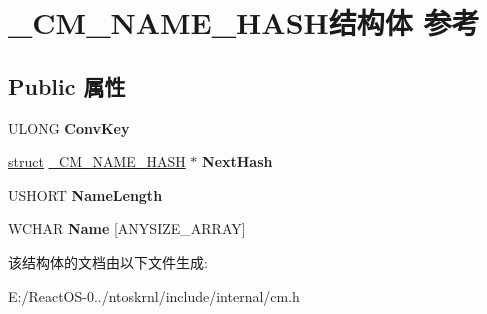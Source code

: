 \hypertarget{struct___c_m___n_a_m_e___h_a_s_h}{}\section{\+\_\+\+C\+M\+\_\+\+N\+A\+M\+E\+\_\+\+H\+A\+S\+H结构体 参考}
\label{struct___c_m___n_a_m_e___h_a_s_h}
\subsection*{Public 属性}
\begin{DoxyCompactItemize}
\item 
\mbox{\label{struct___c_m___n_a_m_e___h_a_s_h_aee31f246bcf9559f31e558f966cf130f}} 
U\+L\+O\+NG {\bfseries Conv\+Key}
\item 
\mbox{\label{struct___c_m___n_a_m_e___h_a_s_h_ac2425441edca9ee9b3660fb3b8094792}} 
\hyperlink{interfacestruct}{struct} \hyperlink{struct___c_m___n_a_m_e___h_a_s_h}{\+\_\+\+C\+M\+\_\+\+N\+A\+M\+E\+\_\+\+H\+A\+SH} $\ast$ {\bfseries Next\+Hash}
\item 
\mbox{\label{struct___c_m___n_a_m_e___h_a_s_h_ae4e449cf1c53827e45edb03ff2cbc80b}} 
U\+S\+H\+O\+RT {\bfseries Name\+Length}
\item 
\mbox{\label{struct___c_m___n_a_m_e___h_a_s_h_a0675a2e74f5f0b7fcc329b3fb70b026e}} 
W\+C\+H\+AR {\bfseries Name} \mbox{[}A\+N\+Y\+S\+I\+Z\+E\+\_\+\+A\+R\+R\+AY\mbox{]}
\end{DoxyCompactItemize}


该结构体的文档由以下文件生成\+:\begin{DoxyCompactItemize}
\item 
E\+:/\+React\+O\+S-\/0../ntoskrnl/include/internal/cm.\+h\end{DoxyCompactItemize}
